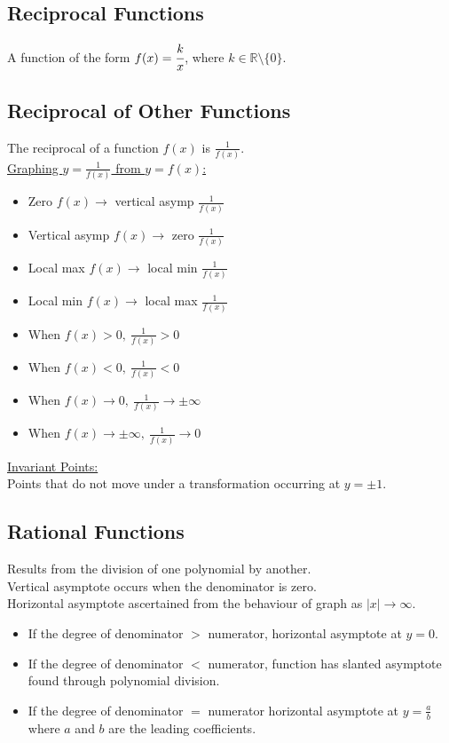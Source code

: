 \documentclass[10pt, a4paper, titlepage]{article}
\newcommand{\mbb}[1]{\mathbb{#1}}
\begin{document}
\begin{multicols*}{3}
	\dotfill
	\subsection{Reciprocal Functions}
	A function of the form $f(x)=\cfrac{k}{x}$, where $k\in\mbb{R}\setminus \{0\}$.

	\dotfill
	\subsection{Reciprocal of Other Functions}
	The reciprocal of a function $f(x)$ is $\frac{1}{f(x)}$.\\
	\underline{Graphing $y=\frac{1}{f(x)}$ from $y=f(x)$:}
	\begin{itemize}
		\item Zero $f(x)\to$ vertical asymp $\frac{1}{f(x)}$
		\item Vertical asymp $f(x)\to$ zero $\frac{1}{f(x)}$
		\item Local max $f(x)\to$ local min $\frac{1}{f(x)}$
		\item Local min $f(x)\to$ local max $\frac{1}{f(x)}$
		\item When $f(x)>0,\ \frac{1}{f(x)}>0$
		\item When $f(x)<0,\ \frac{1}{f(x)}<0$
		\item When $f(x)\to 0,\ \frac{1}{f(x)}\to \pm \infty$
		\item When $f(x)\to \pm \infty,\ \frac{1}{f(x)}\to 0$
	\end{itemize}
	\underline{Invariant Points:}
	\\Points that do not move under a transformation occurring at $y=\pm 1$.

	\dotfill
	\subsection{Rational Functions}
	Results from the division of one polynomial by another.\\
	Vertical asymptote occurs when the denominator is zero.\\
	Horizontal asymptote ascertained from the behaviour of graph as $|x|\to \infty$.
	\begin{itemize}
		\item If the degree of denominator $>$ numerator, horizontal asymptote at $y=0$.
		\item If the degree of denominator $<$ numerator, function has slanted asymptote found through polynomial division.
		\item If the degree of denominator $=$ numerator horizontal asymptote at $y=\frac{a}{b}$ where $a$ and $b$ are the leading coefficients.
	\end{itemize}


\end{multicols*}
\end{document}
